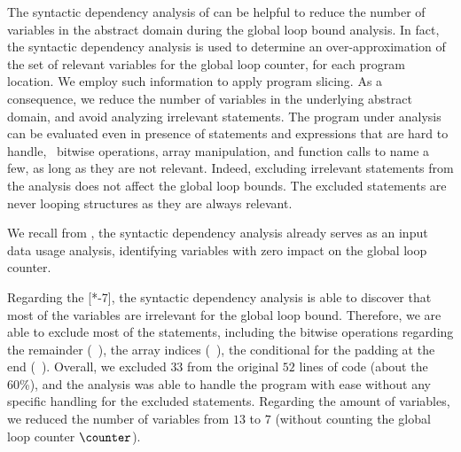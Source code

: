 The syntactic dependency analysis of  can be helpful to reduce the number of variables in the abstract domain during the global loop bound analysis.
In fact, the syntactic dependency analysis is used to determine an over-approximation of the set of relevant variables for the global loop counter, for each program location.
We employ such information to apply program slicing.
As a consequence, we reduce the number of variables in the underlying abstract domain, and avoid analyzing irrelevant statements.
The program under analysis can be evaluated even in presence of statements and expressions that are hard to handle, \eg~bitwise operations, array manipulation, and function calls to name a few, as long as they are not relevant.
Indeed, excluding irrelevant statements from the analysis does not affect the global loop bounds.
The excluded statements are never looping structures as they are always relevant.


We recall from , the syntactic dependency analysis already serves as an input data usage analysis, identifying variables with zero impact on the global loop counter.

\begin{example}
%   

Regarding the [*-7], the syntactic dependency analysis is able to discover that most of the variables are irrelevant for the global loop bound.
Therefore, we are able to exclude most of the statements, including the bitwise operations regarding the remainder (\eg~), the array indices (\eg~), the conditional for the padding at the end (\cf~).
%
Overall, we excluded $33$ from the original $52$ lines of code (about the 60\%), and the analysis was able to handle the program with ease without any specific handling for the excluded statements.
Regarding the amount of variables, we reduced the number of variables from $13$ to $7$ (without counting the global loop counter $\counter$).
\end{example}



